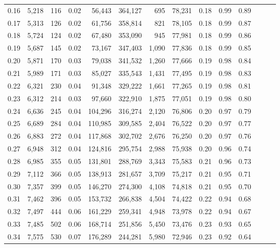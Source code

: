 \begin{tabular}{rrrrrrrrrrrrrr}
0.16 &  5,218 &    116 &  0.02 &   56,443 &  364,127 &     695 &  78,231 &  0.18 &  0.99 &      0.89 \\
0.17 &  5,313 &    126 &  0.02 &   61,756 &  358,814 &     821 &  78,105 &  0.18 &  0.99 &      0.87 \\
0.18 &  5,724 &    124 &  0.02 &   67,480 &  353,090 &     945 &  77,981 &  0.18 &  0.99 &      0.86 \\
0.19 &  5,687 &    145 &  0.02 &   73,167 &  347,403 &   1,090 &  77,836 &  0.18 &  0.99 &      0.85 \\
0.20 &  5,871 &    170 &  0.03 &   79,038 &  341,532 &   1,260 &  77,666 &  0.19 &  0.98 &      0.84 \\
0.21 &  5,989 &    171 &  0.03 &   85,027 &  335,543 &   1,431 &  77,495 &  0.19 &  0.98 &      0.83 \\
0.22 &  6,321 &    230 &  0.04 &   91,348 &  329,222 &   1,661 &  77,265 &  0.19 &  0.98 &      0.81 \\
0.23 &  6,312 &    214 &  0.03 &   97,660 &  322,910 &   1,875 &  77,051 &  0.19 &  0.98 &      0.80 \\
0.24 &  6,636 &    245 &  0.04 &  104,296 &  316,274 &   2,120 &  76,806 &  0.20 &  0.97 &      0.79 \\
0.25 &  6,689 &    284 &  0.04 &  110,985 &  309,585 &   2,404 &  76,522 &  0.20 &  0.97 &      0.77 \\
0.26 &  6,883 &    272 &  0.04 &  117,868 &  302,702 &   2,676 &  76,250 &  0.20 &  0.97 &      0.76 \\
0.27 &  6,948 &    312 &  0.04 &  124,816 &  295,754 &   2,988 &  75,938 &  0.20 &  0.96 &      0.74 \\
0.28 &  6,985 &    355 &  0.05 &  131,801 &  288,769 &   3,343 &  75,583 &  0.21 &  0.96 &      0.73 \\
0.29 &  7,112 &    366 &  0.05 &  138,913 &  281,657 &   3,709 &  75,217 &  0.21 &  0.95 &      0.71 \\
0.30 &  7,357 &    399 &  0.05 &  146,270 &  274,300 &   4,108 &  74,818 &  0.21 &  0.95 &      0.70 \\
0.31 &  7,462 &    396 &  0.05 &  153,732 &  266,838 &   4,504 &  74,422 &  0.22 &  0.94 &      0.68 \\
0.32 &  7,497 &    444 &  0.06 &  161,229 &  259,341 &   4,948 &  73,978 &  0.22 &  0.94 &      0.67 \\
0.33 &  7,485 &    502 &  0.06 &  168,714 &  251,856 &   5,450 &  73,476 &  0.23 &  0.93 &      0.65 \\
0.34 &  7,575 &    530 &  0.07 &  176,289 &  244,281 &   5,980 &  72,946 &  0.23 &  0.92 &      0.64 \\

\end{tabular}
